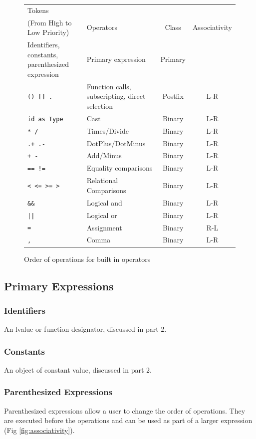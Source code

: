\documentclass[12pt,A4]{book}
\begin{document}
\begin{figure}
\center
\begin{tabular}{|p{}|p{}|c|c|}
\hline
Tokens\\(From High to Low Priority) & Operators & Class & Associativity \\ \hline
Identifiers, constants, parenthesized expression & Primary expression & Primary	& \\ \hline
\verb|() [] .|	& Function calls, subscripting, direct selection & Postfix & L-R \\ \hline
\verb|id as Type| & Cast & Binary & L-R \\ \hline
\verb|* /| &	Times/Divide	& Binary &	L-R \\ \hline
\verb|.+ .-| &	DotPlus/DotMinus	& Binary &	L-R \\ \hline
\verb|+ -| &	Add/Minus	& Binary &	L-R \\ \hline
\verb|== !=| & Equality comparisons & Binary & L-R \\ \hline
\verb|< <= >= >| & Relational Comparisons & Binary & L-R \\ \hline
\verb|&&| &	Logical and	& Binary	& L-R \\ \hline
\verb.||.	& Logical or & Binary & L-R \\ \hline
\verb|=| &	Assignment  & 	Binary & R-L \\ \hline
\verb|,| & Comma & Binary & L-R \\ \hline
\end{tabular}
\label{fig:order_of_operations}
\caption{Order of operations for built in operators}
\end{figure}

\subsection{Primary Expressions}
\subsubsection{Identifiers}
An lvalue or function designator, discussed in part 2.
\subsubsection{Constants}
An object of constant value, discussed in part 2.
\subsubsection{Parenthesized Expressions}
Parenthesized expressions allow a user to change the order of operations. They are executed before the operations and can be used as part of a larger expression (Fig \ref{fig:associativity}).
\end{document}
